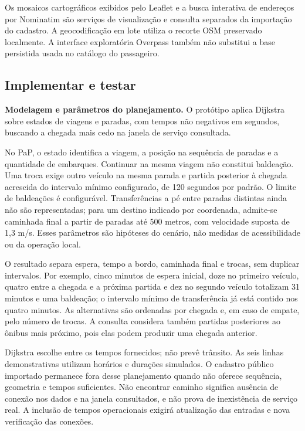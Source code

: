 \documentclass[12pt,oneside,a4paper,brazil]{abntex2}
\begin{document}
Os mosaicos cartográficos exibidos pelo Leaflet e a busca interativa de endereços por Nominatim são serviços de visualização e consulta separados da importação do cadastro. A geocodificação em lote utiliza o recorte OSM preservado localmente. A interface exploratória Overpass também não substitui a base persistida usada no catálogo do passageiro.

\subsection{Implementar e testar}
\label{sec:implementar-testar}
\textbf{Modelagem e parâmetros do planejamento.} O protótipo aplica Dijkstra sobre estados de viagens e paradas, com tempos não negativos em segundos, buscando a chegada mais cedo na janela de serviço consultada.

No PaP, o estado identifica a viagem, a posição na sequência de paradas e a quantidade de embarques. Continuar na mesma viagem não constitui baldeação. Uma troca exige outro veículo na mesma parada e partida posterior à chegada acrescida do intervalo mínimo configurado, de 120 segundos por padrão. O limite de baldeações é configurável. Transferências a pé entre paradas distintas ainda não são representadas; para um destino indicado por coordenada, admite-se caminhada final a partir de paradas até 500 metros, com velocidade suposta de 1,3 m/s. Esses parâmetros são hipóteses do cenário, não medidas de acessibilidade ou da operação local.

O resultado separa espera, tempo a bordo, caminhada final e trocas, sem duplicar intervalos. Por exemplo, cinco minutos de espera inicial, doze no primeiro veículo, quatro entre a chegada e a próxima partida e dez no segundo veículo totalizam 31 minutos e uma baldeação; o intervalo mínimo de transferência já está contido nos quatro minutos. As alternativas são ordenadas por chegada e, em caso de empate, pelo número de trocas. A consulta considera também partidas posteriores ao ônibus mais próximo, pois elas podem produzir uma chegada anterior.

Dijkstra escolhe entre os tempos fornecidos; não prevê trânsito. As seis linhas demonstrativas utilizam horários e durações simulados. O cadastro público importado permanece fora desse planejamento quando não oferece sequência, geometria e tempos suficientes. Não encontrar caminho significa ausência de conexão nos dados e na janela consultados, e não prova de inexistência de serviço real. A inclusão de tempos operacionais exigirá atualização das entradas e nova verificação das conexões.
\end{document}
